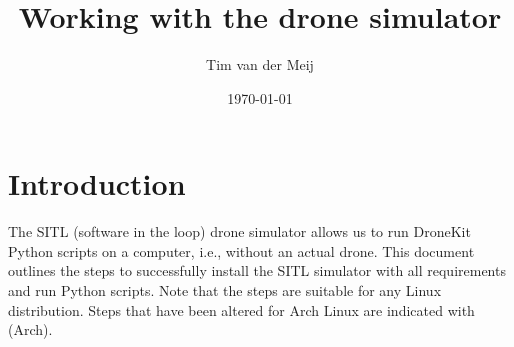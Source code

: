 \documentclass{article}
\newcommand{\arch}{{\color{red} (Arch)}}
\begin{document}
\title{Working with the drone simulator}
\author{Tim van der Meij}
\date{\today}

\maketitle

\section*{Introduction}
The SITL (software in the loop) drone simulator allows us to run DroneKit Python scripts
on a computer, i.e., without an actual drone. This document outlines the steps to successfully
install the SITL simulator with all requirements and run Python scripts. Note that the steps are
suitable for any Linux distribution. Steps that have been altered for Arch Linux are indicated
with \arch{}.
\end{document}
